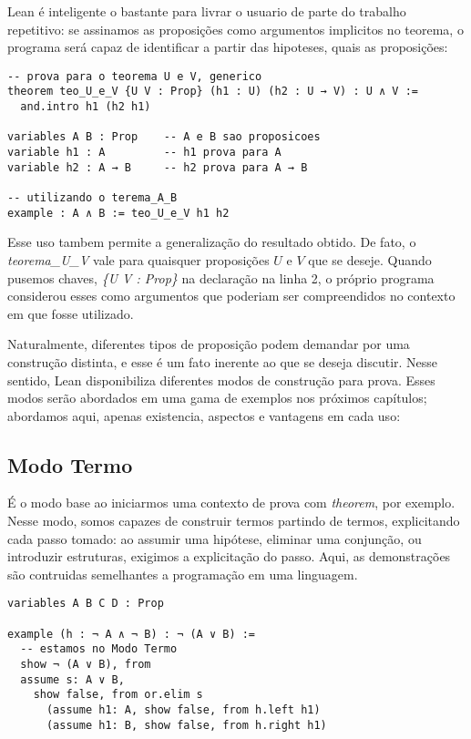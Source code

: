 Lean é inteligente o bastante para livrar o usuario de parte do trabalho repetitivo: se assinamos as proposições como argumentos implicitos no teorema, o programa será capaz de identificar a partir das hipoteses, quais as proposições:

\vspace{5mm}
\begin{lstlisting}
-- prova para o teorema U e V, generico
theorem teo_U_e_V {U V : Prop} (h1 : U) (h2 : U → V) : U ∧ V :=
  and.intro h1 (h2 h1)

variables A B : Prop    -- A e B sao proposicoes
variable h1 : A         -- h1 prova para A
variable h2 : A → B     -- h2 prova para A → B

-- utilizando o terema_A_B
example : A ∧ B := teo_U_e_V h1 h2
\end{lstlisting}
\vspace{5mm}

\noindent Esse uso tambem permite a generalização do resultado obtido. De fato, o \textit{teorema\_U\_V} vale para quaisquer proposições $U$ e $V$ que se deseje. Quando pusemos chaves, \textit{\{U V : Prop\}} na declaração na linha 2, o próprio programa considerou esses como argumentos que poderiam ser compreendidos no contexto em que fosse utilizado.

\vspace{5mm}

Naturalmente, diferentes tipos de proposição podem demandar por uma construção distinta, e esse é um fato inerente ao que se deseja discutir. Nesse sentido, Lean disponibiliza diferentes modos de construção para prova. Esses modos serão abordados em uma gama de exemplos nos próximos capítulos; abordamos aqui, apenas existencia, aspectos e vantagens em cada uso:

\subsection{Modo Termo}
É o modo base ao iniciarmos uma contexto de prova com \textit{theorem}, por exemplo. Nesse modo, somos capazes de construir termos partindo de termos, explicitando cada passo tomado: ao assumir uma hipótese, eliminar uma conjunção, ou introduzir estruturas, exigimos a explicitação do passo. Aqui, as demonstrações são contruidas semelhantes a programação em uma linguagem.

\vspace{5mm}
\begin{lstlisting}
variables A B C D : Prop

example (h : ¬ A ∧ ¬ B) : ¬ (A ∨ B) :=
  -- estamos no Modo Termo
  show ¬ (A ∨ B), from
  assume s: A ∨ B,
    show false, from or.elim s
      (assume h1: A, show false, from h.left h1)
      (assume h1: B, show false, from h.right h1)
\end{lstlisting}
\vspace{5mm}

